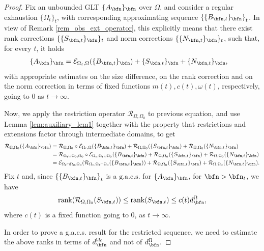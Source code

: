 \documentclass{amsart}
\begin{document}
\begin{proof}
    Fix an unbounded GLT $\{A_\bfn\}_\bfn$ over $\Omega$, and consider a regular exhaustion $\{\Omega_t\}_t$, with corresponding approximating sequence $\left\{\{B_{\bfn,t}\}_\bfn\right\}_t$. In view of Remark \ref{rem_obs_ext_operator}, this explicitly means that there exist rank corrections $\{\{S_{\bfn,t}\}_\bfn\}_t$ and norm corrections $\{\{N_{\bfn,t}\}_\bfn\}_t$, such that, for every $t$, it holds 
    \begin{align*}
        \{A_\bfn\}_\bfn&=\mathcal{E}_{\Omega_t,\Omega}(\{B_{\bfn,t}\}_\bfn)+\{S_{\bfn,t}\}_\bfn+\{N_{\bfn,t}\}_\bfn,
    \end{align*}
    with appropriate estimates on the size difference, on the rank correction and on the norm correction in terms of fixed functions $m(t),c(t),\omega(t)$, respectively, going to $0$ as $t\to\infty$.
    
    Now, we apply the restriction operator $\mathcal{R}_{\Omega,\Omega_0}$ to previous equation, and use Lemma \ref{lem:auxiliary_lem1} together with the property that restrictions and extensions factor through intermediate domains, to get
    \begin{align*}
        \mathcal{R}_{\Omega,\Omega_0}(\{A_\bfn\}_\bfn)&=\mathcal{R}_{\Omega,\Omega_0}\circ\mathcal{E}_{\Omega_t,\Omega}(\{B_{\bfn,t}\}_\bfn)+\mathcal{R}_{\Omega,\Omega_0}(\{S_{\bfn,t}\}_\bfn)+\mathcal{R}_{\Omega,\Omega_0}(\{N_{\bfn,t}\}_\bfn)\\
         &=\mathcal{R}_{\Omega_t\cup\Omega_0,\Omega_0}\circ\mathcal{E}_{\Omega_t,\Omega_t\cup\Omega_0}(\{B_{\bfn,t}\}_\bfn)+\mathcal{R}_{\Omega,\Omega_0}(\{S_{\bfn,t}\}_\bfn)+\mathcal{R}_{\Omega,\Omega_0}(\{N_{\bfn,t}\}_\bfn)\\
        &=\mathcal{E}_{\Omega_t\cap\Omega_0,\Omega_0}(\mathcal{R}_{\Omega_t,\Omega_t\cap\Omega_0}(\{B_{\bfn,t}\}_\bfn))+\mathcal{R}_{\Omega,\Omega_0}(\{S_{\bfn,t}\}_\bfn)+\mathcal{R}_{\Omega,\Omega_0}(\{N_{\bfn,t}\}_\bfn).
    \end{align*}
    Fix $t$ and, since $\left\{\{B_{\bfn,t}\}_\bfn\right\}_t$ is a $\mathrm{g.a.c.s.}$ for $\{A_\bfn\}_\bfn$, for $\bfn>\bfn_t$, we have
    \begin{equation*}
        \mathrm{rank}(\mathcal{R}_{\Omega,\Omega_0}(S_{\bfn,t}))\leq\mathrm{rank}(S_{\bfn,t})\leq c(t)d_\bfn^{\Omega},
    \end{equation*}
    where $c(t)$ is a fixed function going to $0$, as $t\to\infty$. 
    
    In order to prove a g.a.c.s. result for the restricted sequence, we need to estimate the above ranks in terms of $d_\bfn^{\Omega_0}$ and not of $d_\bfn^{\Omega}$.
    

\end{proof}
\end{document}
